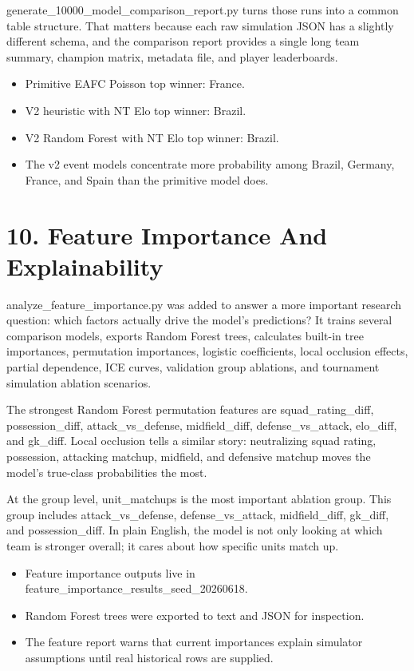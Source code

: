 \documentclass[10pt]{article}
\begin{document}
generate\_10000\_model\_comparison\_report.py turns those runs into a common table structure. That matters because each raw simulation JSON has a slightly different schema, and the comparison report provides a single long team summary, champion matrix, metadata file, and player leaderboards.

\begin{itemize}
  \item Primitive EAFC Poisson top winner: France.
  \item V2 heuristic with NT Elo top winner: Brazil.
  \item V2 Random Forest with NT Elo top winner: Brazil.
  \item The v2 event models concentrate more probability among Brazil, Germany, France, and Spain than the primitive model does.
\end{itemize}

\section{10. Feature Importance And Explainability}

analyze\_feature\_importance.py was added to answer a more important research question: which factors actually drive the model's predictions? It trains several comparison models, exports Random Forest trees, calculates built-in tree importances, permutation importances, logistic coefficients, local occlusion effects, partial dependence, ICE curves, validation group ablations, and tournament simulation ablation scenarios.

The strongest Random Forest permutation features are squad\_rating\_diff, possession\_diff, attack\_vs\_defense, midfield\_diff, defense\_vs\_attack, elo\_diff, and gk\_diff. Local occlusion tells a similar story: neutralizing squad rating, possession, attacking matchup, midfield, and defensive matchup moves the model's true-class probabilities the most.

At the group level, unit\_matchups is the most important ablation group. This group includes attack\_vs\_defense, defense\_vs\_attack, midfield\_diff, gk\_diff, and possession\_diff. In plain English, the model is not only looking at which team is stronger overall; it cares about how specific units match up.

\begin{itemize}
  \item Feature importance outputs live in feature\_importance\_results\_seed\_20260618.
  \item Random Forest trees were exported to text and JSON for inspection.
  \item The feature report warns that current importances explain simulator assumptions until real historical rows are supplied.
\end{itemize}
\end{document}

